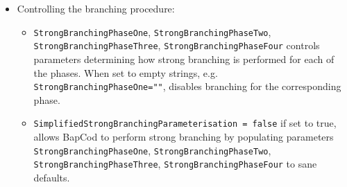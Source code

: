 \begin{itemize}
	\item Controlling the branching procedure:
	      \begin{itemize}
		      \item \texttt{StrongBranchingPhaseOne}, \texttt{StrongBranchingPhaseTwo}, \texttt{StrongBranchingPhaseThree}, \texttt{StrongBranchingPhaseFour} controls parameters determining how strong branching is performed for each of the phases.
		            When set to empty strings, e.g. \texttt{StrongBranchingPhaseOne=""}, disables branching for the corresponding phase.
		      \item \texttt{SimplifiedStrongBranchingParameterisation = false} if set to true, allows BapCod to perform strong branching by populating parameters \texttt{StrongBranchingPhaseOne}, \texttt{StrongBranchingPhaseTwo}, \texttt{StrongBranchingPhaseThree}, \texttt{StrongBranchingPhaseFour} to sane defaults.
	      \end{itemize}


\end{itemize}

